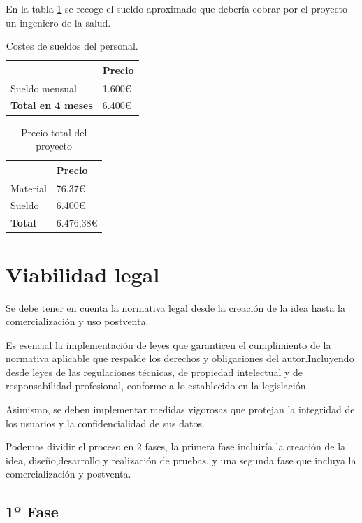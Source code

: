 En la tabla \ref{tab:costes_personal} se recoge el sueldo aproximado que debería cobrar por el proyecto un ingeniero de la salud.

\begin{table}[h]
\centering
\begin{tabular}{|l|l|}
\hline
\rowcolor[HTML]{BFBFBF} 
\textbf{} & \textbf{Precio} \\ \hline
Sueldo mensual & 1.600€ \\ \hline
\textbf{Total en 4 meses }& 6.400€ \\ \hline
\end{tabular}
\caption{Costes de sueldos del personal.}
\label{tab:costes_personal}
\end{table}

\begin{table}[h]
\centering
\begin{tabular}{|l|l|}
\hline
\rowcolor[HTML]{BFBFBF} 
\textbf{} & \textbf{Precio} \\ \hline
Material & 76,37€ \\ \hline
Sueldo  &  6.400€ \\ \hline
\textbf{Total }& 6.476,38€ \\ \hline
\end{tabular}
\caption{Precio total del proyecto}
\label{tab:Costes Totales}
\end{table}

\section{Viabilidad legal}
Se debe tener en cuenta la normativa legal desde la creación de la idea hasta la comercialización y uso postventa.

Es esencial la implementación de leyes que garanticen el cumplimiento de la normativa aplicable que respalde los derechos y obligaciones del autor.Incluyendo desde leyes de las regulaciones técnicas, de propiedad intelectual y de responsabilidad profesional, conforme a lo establecido en la legislación.

Asimismo, se deben implementar medidas vigorosas que protejan la integridad de los usuarios y la confidencialidad de sus datos. 

Podemos dividir el proceso en 2 fases, la primera fase incluiría la creación de la idea, diseño,desarrollo y realización de pruebas, y una segunda fase que incluya la comercialización y postventa.

\subsection{1º Fase}

